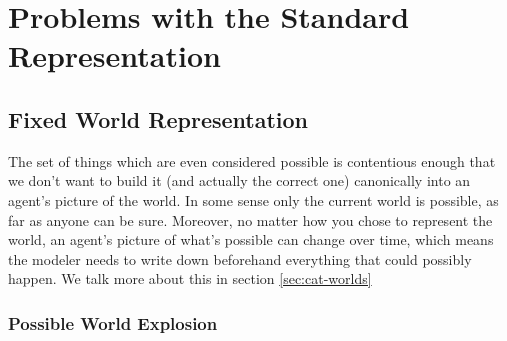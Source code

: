\documentclass{article}
\begin{document}
	\section{Problems with the Standard Representation}
	\subsection{Fixed World Representation}
	
	The set of things which are even considered possible is contentious enough that we don't want to build it (and actually the correct one) canonically into an agent's picture of the world. In some sense only the current world is possible, as far as anyone can be sure. Moreover, no matter how you chose to represent the world, an agent's picture of what's possible can change over time, which means the modeler needs to write down beforehand everything that could possibly happen. We talk more about this in section \ref{sec:cat-worlds}
	
	\subsubsection{Possible World Explosion} \label{sec:world-explosion}
	

%	
%	
%	
	
	
\end{document}
